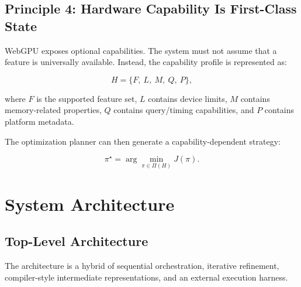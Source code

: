 \documentclass[11pt,a4paper,oneside]{report}
\begin{document}
\section{Principle 4: Hardware Capability Is First-Class State}

WebGPU exposes optional capabilities. The system must not assume that a feature is universally
available. Instead, the capability profile is represented as:

\[
H =
\{
F,\ L,\ M,\ Q,\ P
\},
\]

where $F$ is the supported feature set, $L$ contains device limits, $M$ contains memory-related
properties, $Q$ contains query/timing capabilities, and $P$ contains platform metadata.

The optimization planner can then generate a capability-dependent strategy:

\[
\pi^\star = \arg\min_{\pi\in\Pi(H)}J(\pi).
\]

\chapter{System Architecture}

\section{Top-Level Architecture}

The architecture is a hybrid of sequential orchestration, iterative refinement, compiler-style
intermediate representations, and an external execution harness.
\end{document}
